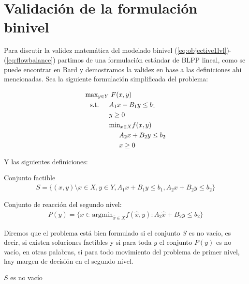 \chapter{Validación de la formulación binivel}
\label{sect:apendixbilevelvalidation}

Para discutir la validez matemática del modelado binivel (\ref{eq:objective1lvl})-(\ref{eq:flowbalance}) partimos de una formulación estándar de BLPP lineal, como se puede encontrar en Bard \cite{bardbook} y demostramos la validez en base a las definiciones ahi mencionadas.
Sea la siguiente formulación simplificada del problema:

\begin{align}
\text{max}_{y \in Y}    & \; F(x, y) \label{bilevelgeneric1} \\
\text{s.t.} \hspace{1.5em} & A_1 x + B_1 y \leq b_1 \\
                        & y \geq 0 \\
                        & \text{min}_{x \in X} f(x, y) \\
                        & \hspace{1.5em} A_2 x + B_2 y \leq b_2 \label{bilevelgeneric5} \\
                        & \hspace{1.5em} x \geq 0 \label{bilevelgeneric6}
\end{align}

Y las siguientes definiciones:

\begin{definition}
Conjunto factible
\begin{align}
  S = \{(x, y) \setminus x \in X, y \in Y, A_1 x + B_1 y \leq b_1, A_2 x + B_2 y \leq b_2 \}
\end{align}
\end{definition}

\begin{definition}
Conjunto de reacción del segundo nivel:
\begin{align}
  P(y) = \{ x \in \text{argmin}_{\hat{x} \in X} f(\hat{x}, y) : A_2 \hat{x} + B_2 y \leq b_2 \}
\end{align}
\end{definition}

Diremos que el problema está bien formulado si el conjunto $S$ es no vacío, es decir, si existen soluciones factibles y si para toda $y$ el conjunto $P(y)$ es no vacío, en otras palabras, si para todo movimiento del problema de primer nivel, hay margen de decisión en el segundo nivel.

\begin{lemma}$S$ es no vacío
\end{lemma}

